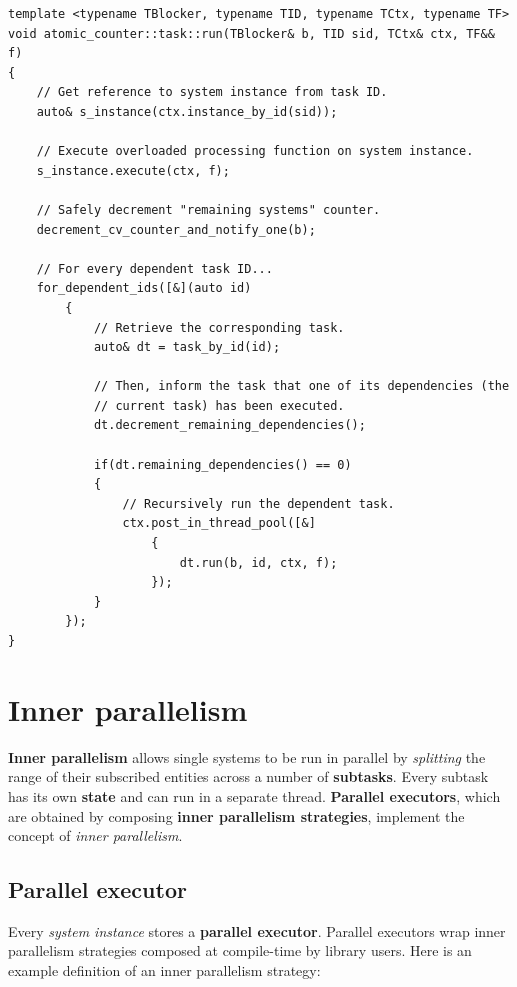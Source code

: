 \documentclass[twoside, 12pt, a4paper, openany]{book}
\begin{document}
\begin{verbatim}
template <typename TBlocker, typename TID, typename TCtx, typename TF>
void atomic_counter::task::run(TBlocker& b, TID sid, TCtx& ctx, TF&& f)
{
    // Get reference to system instance from task ID.
    auto& s_instance(ctx.instance_by_id(sid));

    // Execute overloaded processing function on system instance.
    s_instance.execute(ctx, f);

    // Safely decrement "remaining systems" counter.
    decrement_cv_counter_and_notify_one(b);

    // For every dependent task ID...
    for_dependent_ids([&](auto id)
        {
            // Retrieve the corresponding task.
            auto& dt = task_by_id(id);

            // Then, inform the task that one of its dependencies (the
            // current task) has been executed.
            dt.decrement_remaining_dependencies();

            if(dt.remaining_dependencies() == 0)
            {
                // Recursively run the dependent task.
                ctx.post_in_thread_pool([&]
                    {
                        dt.run(b, id, ctx, f);
                    });
            }
        });
}
\end{verbatim}

\hypertarget{multithreading_inner_par}{\section{Inner
parallelism}\label{multithreading_inner_par}}

\textbf{Inner parallelism} allows single systems to be run in parallel
by \emph{splitting} the range of their subscribed entities across a
number of \textbf{subtasks}. Every subtask has its own \textbf{state}
and can run in a separate thread. \textbf{Parallel executors}, which are
obtained by composing \textbf{inner parallelism strategies}, implement
the concept of \emph{inner parallelism}.

\hypertarget{multithreading_par_executor}{\subsection{Parallel
executor}\label{multithreading_par_executor}}

Every \emph{system instance} stores a \textbf{parallel executor}.
Parallel executors wrap inner parallelism strategies composed at
compile-time by library users. Here is an example definition of an inner
parallelism strategy:
\end{document}
